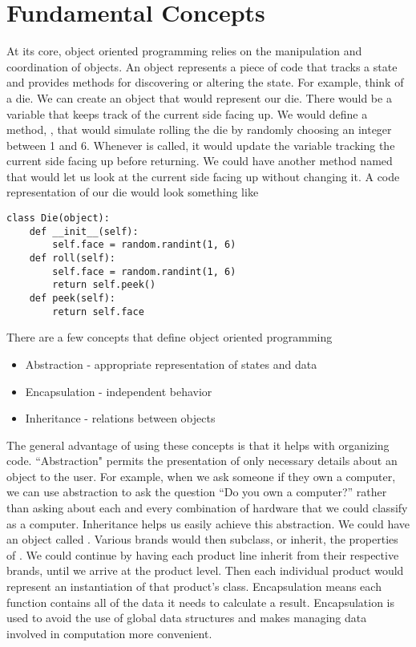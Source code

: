 \section*{Fundamental Concepts}
At its core, object oriented programming relies on the manipulation and coordination of objects.
An object represents a piece of code that tracks a state and provides methods for discovering or altering the state.
For example, think of a die.
We can create an object that would represent our die.
There would be a variable that keeps track of the current side facing up.
We would define a method, , that would simulate rolling the die by randomly choosing an integer between 1 and 6.
Whenever  is called, it would update the variable tracking the current side facing up before returning.
We could have another method named  that would let us look at the current side facing up without changing it.
A code representation of our die would look something like
\begin{lstlisting}
class Die(object):
    def __init__(self):
        self.face = random.randint(1, 6)
    def roll(self):
        self.face = random.randint(1, 6)
        return self.peek()
    def peek(self):
        return self.face
\end{lstlisting}

There are a few concepts that define object oriented programming

\begin{itemize}

\item Abstraction - appropriate representation of states and data

\item Encapsulation - independent behavior

\item Inheritance - relations between objects

\end{itemize}

The general advantage of using these concepts is that it helps with organizing code.
``Abstraction" permits the presentation of only necessary details about an object to the user.
For example, when we ask someone if they own a computer, we can use abstraction to ask the question ``Do you own a computer?'' rather than asking about each and every combination of hardware that we could classify as a computer.
Inheritance helps us easily achieve this abstraction.
We could have an object called .
Various brands would then subclass, or inherit, the properties of .
We could continue by having each product line inherit from their respective brands, until we arrive at the product level.
Then each individual product would represent an instantiation of that product's class.
Encapsulation means each function contains all of the data it needs to calculate a result.
Encapsulation is used to avoid the use of global data structures and makes managing data involved in computation more convenient.

